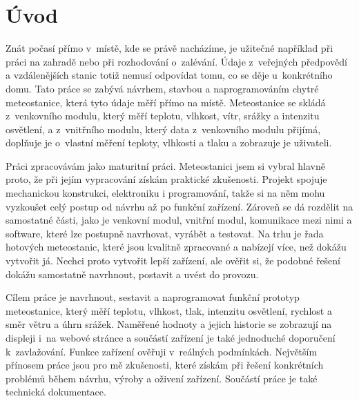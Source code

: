 \chapter * {Úvod}

Znát počasí přímo v~místě, kde se právě nacházíme, je užitečné například při práci na zahradě nebo při rozhodování o~zalévání. Údaje z~veřejných předpovědí a vzdálenějších stanic totiž nemusí odpovídat tomu, co se děje u~konkrétního domu. Tato práce se zabývá návrhem, stavbou a naprogramováním chytré meteostanice, která tyto údaje měří přímo na místě. Meteostanice se skládá z~venkovního modulu, který měří teplotu, vlhkost, vítr, srážky a intenzitu osvětlení, a z~vnitřního modulu, který data z~venkovního modulu přijímá, doplňuje je o~vlastní měření teploty, vlhkosti a tlaku a zobrazuje je uživateli.

Práci zpracovávám jako maturitní práci. Meteostanici jsem si vybral hlavně proto, že při jejím vypracování získám praktické zkušenosti. Projekt spojuje mechanickou konstrukci, elektroniku i programování, takže si na něm mohu vyzkoušet celý postup od návrhu až po funkční zařízení. Zároveň se dá rozdělit na samostatné části, jako je venkovní modul, vnitřní modul, komunikace mezi nimi a software, které lze postupně navrhovat, vyrábět a testovat. Na trhu je řada hotových meteostanic, které jsou kvalitně zpracované a nabízejí více, než dokážu vytvořit já. Nechci proto vytvořit lepší zařízení, ale ověřit si, že podobné řešení dokážu samostatně navrhnout, postavit a uvést do provozu.

Cílem práce je navrhnout, sestavit a naprogramovat funkční prototyp meteostanice, který měří teplotu, vlhkost, tlak, intenzitu osvětlení, rychlost a směr větru a úhrn srážek. Naměřené hodnoty a jejich historie se zobrazují na displeji i~na webové stránce a součástí zařízení je také jednoduché doporučení k~zavlažování. Funkce zařízení ověřuji v~reálných podmínkách. Největším přínosem práce jsou pro mě zkušenosti, které získám při řešení konkrétních problémů během návrhu, výroby a oživení zařízení. Součástí práce je také technická dokumentace.